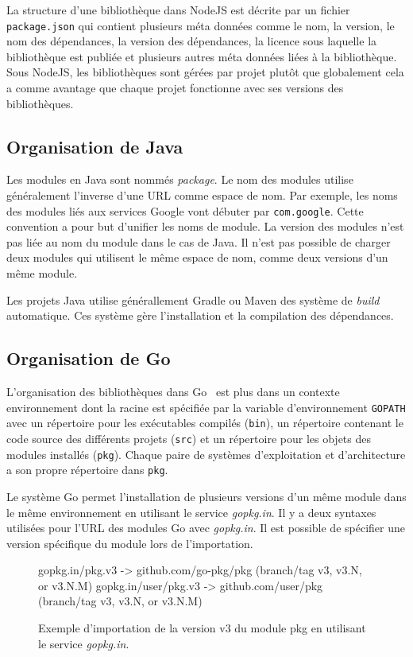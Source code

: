 La structure d'une bibliothèque dans NodeJS est décrite par un fichier
\texttt{package.json} qui contient plusieurs méta données comme
le nom, la version, le nom des dépendances, la version des dépendances,
la licence sous laquelle la bibliothèque est publiée et plusieurs autres
méta données liées à la bibliothèque. Sous NodeJS, les bibliothèques sont gérées
par projet plutôt que globalement cela a comme avantage que chaque projet
fonctionne avec ses versions des bibliothèques.

\subsection{Organisation de Java}
%
Les modules en Java sont nommés \textit{package}.  Le nom des modules utilise
généralement l'inverse d'une URL comme espace de nom. Par exemple, les noms des
modules liés aux services Google vont débuter par \texttt{com.google}. Cette
convention a pour but d'unifier les noms de module. La version des modules
n'est pas liée au nom du module dans le cas de Java. Il n'est pas possible de
charger deux modules qui utilisent le même espace de nom, comme deux versions
d'un même module.

Les projets Java utilise générallement Gradle ou Maven des système de
\textit{build} automatique. Ces système gère l'installation et la compilation
des dépendances.

\subsection{Organisation de Go}
%
L'organisation des bibliothèques dans Go~\cite{GoLang} est plus dans un contexte
environnement dont la racine est spécifiée par la variable d'environnement
\texttt{GOPATH} avec un répertoire pour les exécutables compilés
(\texttt{bin}), un répertoire contenant le code source des différents projets
(\texttt{src}) et un répertoire pour les objets des modules installés
(\texttt{pkg}). Chaque paire de systèmes d'exploitation et d'architecture a son
propre répertoire dans \texttt{pkg}.

Le système Go permet l'installation de plusieurs versions d'un même module dans
le même environnement en utilisant le service \textit{gopkg.in}. Il y a deux
syntaxes utilisées pour l'URL des modules Go avec \textit{gopkg.in}. Il est possible
de spécifier une version spécifique du module lors de l'importation.

\noindent
\begin{figure}[ht]
  \centering
\begin{mplisting}{1}
gopkg.in/pkg.v3      -> github.com/go-pkg/pkg (branch/tag v3, v3.N, or v3.N.M)
gopkg.in/user/pkg.v3 -> github.com/user/pkg   (branch/tag v3, v3.N, or v3.N.M)
\end{mplisting}
  \caption{Exemple d'importation de la version v3 du module pkg en utilisant
    le service \textit{gopkg.in}.}
  \label{fig:gopkg_import}
\end{figure}

